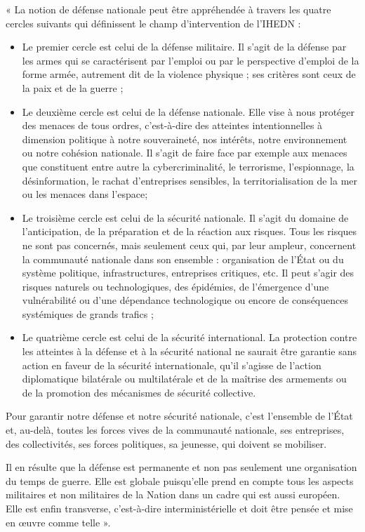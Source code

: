 \documentclass[12pt,a4paper]{article}
\begin{document}
« La notion de défense nationale peut être appréhendée à travers les quatre cercles suivants qui définissent le champ d'intervention de l'IHEDN :
\begin{itemize}
\item Le premier cercle est celui de la défense militaire. Il s'agit de la défense par les armes qui se caractérisent par l'emploi ou par le perspective d'emploi de la forme armée, autrement dit de la violence physique ; ses critères sont ceux de la paix et de la guerre ;
\item Le deuxième cercle est celui de la défense nationale. Elle vise à nous protéger des menaces de tous ordres, c'est-à-dire des atteintes intentionnelles à dimension politique à notre souveraineté, nos intérêts, notre environnement ou notre cohésion nationale. Il s'agit de faire face par exemple aux menaces que constituent entre autre la cybercriminalité, le terrorisme, l'espionnage, la désinformation, le rachat d'entreprises sensibles, la territorialisation de la mer ou les menaces dans l'espace; 
\item Le troisième cercle est celui de la sécurité nationale. Il s'agit du domaine de l'anticipation, de la préparation et de la réaction aux risques. Tous les risques ne sont pas concernés, mais seulement ceux qui, par leur ampleur, concernent la communauté nationale dans son ensemble : organisation de l'État ou du système politique, infrastructures, entreprises critiques, etc. Il peut s'agir des risques naturels ou technologiques, des épidémies, de l'émergence d'une vulnérabilité ou d'une dépendance technologique ou encore de conséquences systémiques de grands trafics ;
\item Le quatrième cercle est celui de la sécurité international. La protection contre les atteintes à la défense et à la sécurité national ne saurait être garantie sans action en faveur de la sécurité internationale, qu'il s'agisse de l'action diplomatique bilatérale ou multilatérale et de la maîtrise des armements ou de la promotion des mécanismes de sécurité collective.
\end{itemize}

Pour garantir notre défense et notre sécurité nationale, c'est l'ensemble de l'État et, au-delà, toutes les forces vives de la communauté nationale, ses entreprises, des collectivités, ses forces politiques, sa jeunesse, qui doivent se mobiliser.

Il en résulte que la défense est permanente et non pas seulement une organisation du temps de guerre. Elle est globale puisqu'elle prend en compte tous les aspects militaires et non militaires de la Nation dans un cadre qui est aussi européen. Elle est enfin transverse, c'est-à-dire interministérielle et doit être pensée et mise en œuvre comme telle ».
\end{document}
